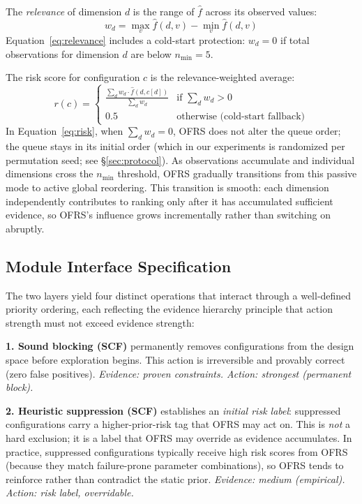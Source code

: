 \documentclass[journal]{IEEEtran}
\begin{document}
The \emph{relevance} of dimension $d$ is the range of $\hat{f}$ across its observed values:
\begin{equation}
w_d = \max_v \hat{f}(d, v) - \min_v \hat{f}(d, v)
\label{eq:relevance}
\end{equation}
Equation~\ref{eq:relevance} includes a cold-start protection: $w_d = 0$ if total observations for dimension $d$ are below $n_{\min} = 5$.

The risk score for configuration $c$ is the relevance-weighted average:
\begin{equation}
r(c) = \begin{cases} \displaystyle\frac{\sum_d w_d \cdot \hat{f}(d, c[d])}{\sum_d w_d} & \text{if } \textstyle\sum_d w_d > 0 \\[6pt] 0.5 & \text{otherwise (cold-start fallback)} \end{cases}
\label{eq:risk}
\end{equation}
In Equation~\ref{eq:risk}, when $\sum_d w_d = 0$, OFRS does not alter the queue order; the queue stays in its initial order (which in our experiments is randomized per permutation seed; see \S\ref{sec:protocol}). As observations accumulate and individual dimensions cross the $n_{\min}$ threshold, OFRS gradually transitions from this passive mode to active global reordering. This transition is smooth: each dimension independently contributes to ranking only after it has accumulated sufficient evidence, so OFRS's influence grows incrementally rather than switching on abruptly.

\subsection{Module Interface Specification}
\label{sec:interface}

The two layers yield four distinct operations that interact through a well-defined priority ordering, each reflecting the evidence hierarchy principle that action strength must not exceed evidence strength:

\textbf{1. Sound blocking (SCF)} permanently removes configurations from the design space before exploration begins. This action is irreversible and provably correct (zero false positives). \emph{Evidence: proven constraints. Action: strongest (permanent block).}

\textbf{2. Heuristic suppression (SCF)} establishes an \emph{initial risk label}: suppressed configurations carry a higher-prior-risk tag that OFRS may act on. This is \emph{not} a hard exclusion; it is a label that OFRS may override as evidence accumulates. In practice, suppressed configurations typically receive high risk scores from OFRS (because they match failure-prone parameter combinations), so OFRS tends to reinforce rather than contradict the static prior. \emph{Evidence: medium (empirical). Action: risk label, overridable.}
\end{document}
